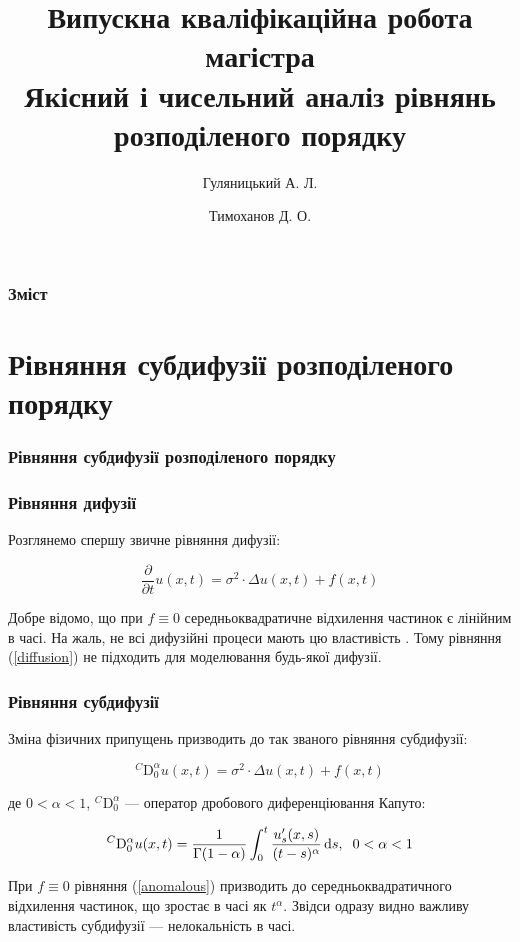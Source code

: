 \documentclass[ukrainian]{beamer}
\author{Тимоханов Д. О.}
\title[Рівняння розподіленого порядку]{{\small Випускна кваліфікаційна робота магістра}\\Якісний і чисельний аналіз рівнянь розподіленого порядку}
\subtitle{Гуляницький А. Л.}
\newcommand*\diff{\mathop{}\!\mathrm{d}}
\newcommand{\DzC}{{}^{C}\mathrm{D}_{0}}
\begin{document}
%
%
\begin{frame}
    \frametitle{Зміст}
    \tableofcontents
\end{frame}

\section{Рівняння субдифузії розподіленого порядку}

\begin{frame}
    \frametitle{Рівняння субдифузії розподіленого порядку}
    \tableofcontents[currentsection]
\end{frame}

\begin{frame}
    \frametitle{Рівняння дифузії}
Розглянемо спершу звичне рівняння дифузії:

\begin{equation}\label{diffusion}
\frac{\partial}{\partial{t}}u(x,t)=\sigma^2\cdot\Delta{u}(x,t)+f(x,t)
\end{equation}

Добре відомо, що при $f\equiv0$ середньоквадратичне відхилення частинок є лінійним в часі. На жаль, не всі дифузійні процеси мають цю властивість \cite{Metzler2001}. Тому рівняння (\ref{diffusion}) не підходить для моделювання будь-якої дифузії.

\end{frame}

\begin{frame}
    \frametitle{Рівняння субдифузії}

Зміна фізичних припущень призводить \cite{Metzler2001} до так званого рівняння субдифузії:

\begin{equation}\label{anomalous}
\DzC^{\alpha}u(x,t)=\sigma^2\cdot\Delta{u}(x,t)+f(x,t)
\end{equation}

де $0<\alpha<1$, $\DzC^{\alpha}$ --- оператор дробового диференціювання Капуто:

\begin{equation}\label{caputo}
\DzC^{\alpha}u(x,t)=\frac{1}{\Gamma(1-\alpha)}\int_0^t\frac{u'_s(x,s)}{(t-s)^\alpha}\diff{s},\hspace{2mm}0<\alpha<1
\end{equation}

При $f\equiv0$ рівняння (\ref{anomalous}) призводить до середньоквадратичного відхилення частинок, що зростає в часі як $t^\alpha$. Звідси одразу видно важливу властивість субдифузії --- нелокальність в часі.

\end{frame}
\end{document}

